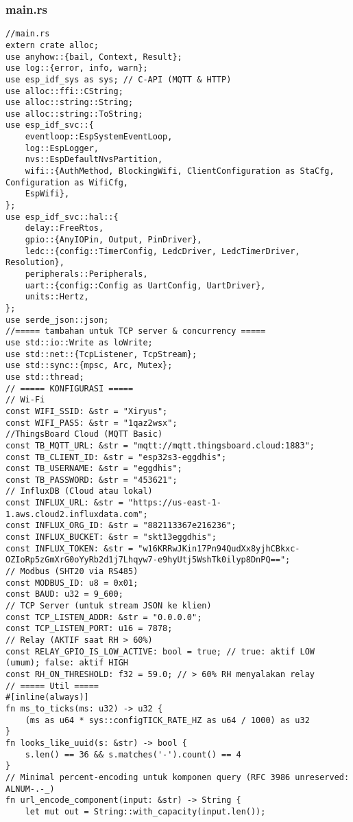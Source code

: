\documentclass[a4paper, 12pt]{article}
\begin{document}
\subsubsection{main.rs}
\begin{lstlisting}[style=ruststyle, caption={main.rs}, basicstyle=\ttfamily\tiny]
//main.rs
extern crate alloc;
use anyhow::{bail, Context, Result};
use log::{error, info, warn};
use esp_idf_sys as sys; // C-API (MQTT & HTTP)
use alloc::ffi::CString;
use alloc::string::String;
use alloc::string::ToString;
use esp_idf_svc::{
    eventloop::EspSystemEventLoop,
    log::EspLogger,
    nvs::EspDefaultNvsPartition,
    wifi::{AuthMethod, BlockingWifi, ClientConfiguration as StaCfg, Configuration as WifiCfg,
    EspWifi},
};
use esp_idf_svc::hal::{
    delay::FreeRtos,
    gpio::{AnyIOPin, Output, PinDriver},
    ledc::{config::TimerConfig, LedcDriver, LedcTimerDriver, Resolution},
    peripherals::Peripherals,
    uart::{config::Config as UartConfig, UartDriver},
    units::Hertz,
};
use serde_json::json;
//===== tambahan untuk TCP server & concurrency =====
use std::io::Write as loWrite;
use std::net::{TcpListener, TcpStream};
use std::sync::{mpsc, Arc, Mutex};
use std::thread;
// ===== KONFIGURASI =====
// Wi-Fi
const WIFI_SSID: &str = "Xiryus";
const WIFI_PASS: &str = "1qaz2wsx";
//ThingsBoard Cloud (MQTT Basic)
const TB_MQTT_URL: &str = "mqtt://mqtt.thingsboard.cloud:1883";
const TB_CLIENT_ID: &str = "esp32s3-eggdhis";
const TB_USERNAME: &str = "eggdhis";
const TB_PASSWORD: &str = "453621";
// InfluxDB (Cloud atau lokal)
const INFLUX_URL: &str = "https://us-east-1-1.aws.cloud2.influxdata.com";
const INFLUX_ORG_ID: &str = "882113367e216236";
const INFLUX_BUCKET: &str = "skt13eggdhis";
const INFLUX_TOKEN: &str = "w16KRRwJKin17Pn94QudXx8yjhCBkxc-OZIoRp5zGmXrG0oYyRb2d1j7Lhqyw7-e9hyUtj5WshTk0ilyp8DnPQ==";
// Modbus (SHT20 via RS485)
const MODBUS_ID: u8 = 0x01;
const BAUD: u32 = 9_600;
// TCP Server (untuk stream JSON ke klien)
const TCP_LISTEN_ADDR: &str = "0.0.0.0";
const TCP_LISTEN_PORT: u16 = 7878;
// Relay (AKTIF saat RH > 60%)
const RELAY_GPIO_IS_LOW_ACTIVE: bool = true; // true: aktif LOW (umum); false: aktif HIGH
const RH_ON_THRESHOLD: f32 = 59.0; // > 60% RH menyalakan relay
// ===== Util =====
#[inline(always)]
fn ms_to_ticks(ms: u32) -> u32 {
    (ms as u64 * sys::configTICK_RATE_HZ as u64 / 1000) as u32
}
fn looks_like_uuid(s: &str) -> bool {
    s.len() == 36 && s.matches('-').count() == 4
}
// Minimal percent-encoding untuk komponen query (RFC 3986 unreserved: ALNUM-.-_)
fn url_encode_component(input: &str) -> String {
    let mut out = String::with_capacity(input.len());

\end{lstlisting}
\end{document}
